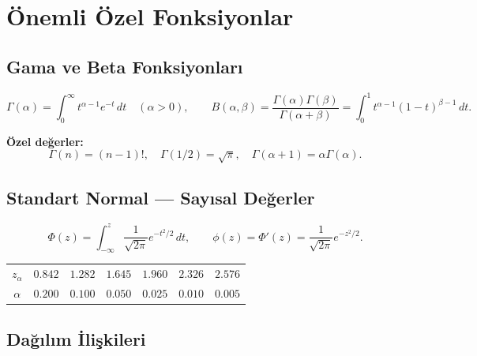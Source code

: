 \section{Önemli Özel Fonksiyonlar}
\label{app:ozel_fonksiyonlar}

\subsection{Gama ve Beta Fonksiyonları}

\[
  \Gamma(\alpha) = \int_0^\infty t^{\alpha-1}e^{-t}\,dt \quad (\alpha>0), \qquad
  B(\alpha,\beta) = \frac{\Gamma(\alpha)\Gamma(\beta)}{\Gamma(\alpha+\beta)} = \int_0^1 t^{\alpha-1}(1-t)^{\beta-1}\,dt.
\]

\noindent\textbf{Özel değerler:}
\[
  \Gamma(n) = (n-1)!, \quad \Gamma(1/2)=\sqrt{\pi}, \quad \Gamma(\alpha+1)=\alpha\Gamma(\alpha).
\]

\subsection{Standart Normal --- Sayısal Değerler}

\[
  \Phi(z) = \int_{-\infty}^z\frac{1}{\sqrt{2\pi}}e^{-t^2/2}\,dt, \qquad \phi(z)=\Phi'(z)=\frac{1}{\sqrt{2\pi}}e^{-z^2/2}.
\]

\begin{center}
\begin{tabular}{ccccccc}
\hline
$z_\alpha$ & $0.842$ & $1.282$ & $1.645$ & $1.960$ & $2.326$ & $2.576$ \\
$\alpha$ & $0.200$ & $0.100$ & $0.050$ & $0.025$ & $0.010$ & $0.005$ \\
\hline
\end{tabular}
\end{center}

\subsection{Dağılım İlişkileri}

